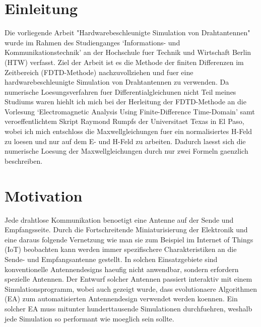 \documentclass[11pt, ngerman]{article}
\begin{document}
\section{Einleitung}
Die vorliegende Arbeit "Hardwarebeschleunigte Simulation von Drahtantennen"
wurde im Rahmen des Studienganges `Informations- und 
Kommunikationstechnik' an der Hochschule fuer Technik und Wirtschaft Berlin
(HTW) verfasst. Ziel der Arbeit ist es die Methode der finiten Differenzen
im Zeitbereich (FDTD-Methode) nachzuvollziehen und fuer eine
hardwarebeschleunigte Simulation von Drahtantennen zu verwenden.
Da numerische Loesungsverfahren fuer Differentialgleichunen nicht
Teil meines Studiums waren hiehlt ich mich bei der Herleitung der FDTD-Methode
an die Vorlesung `Electromagnetic Analysis Using Finite-Difference Time-Domain'
samt veroeffentlichtem Skript Raymond Rumpfs der Universitaet
Texas in El Paso, wobei ich mich entschloss die Maxwellgleichungen fuer
ein normalisiertes H-Feld zu loesen und nur auf dem E- und H-Feld zu arbeiten.
Dadurch laesst sich die numerische Loesung der Maxwellgleichungen
durch nur zwei Formeln gaenzlich beschreiben.

\section{Motivation}
Jede drahtlose Kommunikation benoetigt eine Antenne auf der
Sende und Empfangsseite. Durch die Fortschreitende Miniaturisierung
der Elektronik und eine daraus folgende Vernetzung 
wie man sie zum Beispiel im Internet of Things (IoT)
beobachten kann werden immer spezifischere Charakteristiken
an die Sende- und Empfangsantenne gestellt. In solchen Einsatzgebiete
sind konventionelle Antennendesigns haeufig nicht anwendbar,
sondern erfordern spezielle Antennen. Der Entwurf solcher Antennen
passiert interaktiv mit einem Simulationsprogramm, wobei auch
gezeigt wurde, dass evolutionaere Algorithmen (EA) zum automatisierten
Antennendesign verwendet werden koennen.\cite{nasa_ea_antenna}
Ein solcher EA muss mitunter hunderttausende Simulationen durchfuehren\cite[p.6]{nasa_ea_antenna},
weshalb jede Simulation so performant wie moeglich sein sollte.
\end{document}
